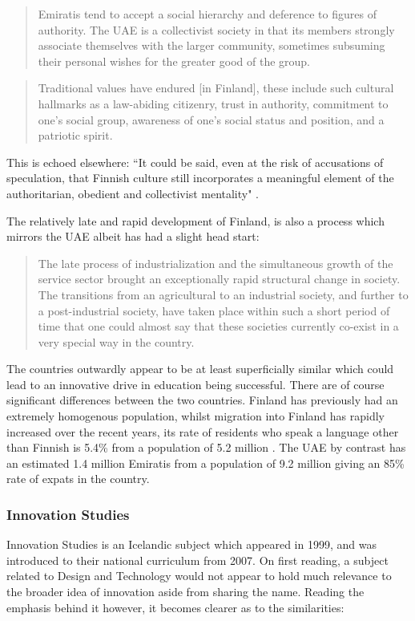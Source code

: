 \documentclass[11pt]{article}
\begin{document}
\begin{quote}
	Emiratis tend to accept a social hierarchy and deference to figures of authority. The UAE is a collectivist society in that its members strongly associate themselves with the larger community, sometimes subsuming their personal wishes for the greater good of the group.
\end{quote} \citep{Hatherley-Greene2016}

\begin{quote}
	Traditional values have endured [in Finland], these include such cultural hallmarks as a law-abiding citizenry, trust in authority, commitment to one’s social group, awareness of one’s social status and position, and a patriotic spirit.
\end{quote} \citep{Sahlberg2007}

This is echoed elsewhere: ``It could be said, even at the risk of accusations of speculation, that Finnish culture still incorporates a meaningful element of the authoritarian, obedient and collectivist mentality" \citep{Simola2005}.

The relatively late and rapid development of Finland, is also a process which mirrors the UAE albeit has had a slight head start:

\begin{quote}
	The late process of industrialization and the simultaneous growth of the service sector brought an exceptionally rapid structural change in society. The transitions from an agricultural to an industrial society, and further to a post-industrial society, have taken place within such a short period of time that one could almost say that these societies currently co-exist in a very special way in the country.
\end{quote} \citep{Simola2005}

The countries outwardly appear to be at least superficially similar which could lead to an innovative drive in education being successful. There are of course significant differences between the two countries. Finland has previously had an extremely homogenous population, whilst migration into Finland has rapidly increased over the recent years, its rate of residents who speak a language other than Finnish is 5.4\% from a population of 5.2 million \citep{OfficialStatisticsofFinlandOSF2011}. The UAE by contrast has an estimated 1.4 million Emiratis \citep{HABBOUSH2013}from a population of 9.2 million \citep{MalitJr.2013} giving an 85\% rate of expats in the country.

\subsubsection{Innovation Studies}
Innovation Studies is an Icelandic subject which appeared in 1999, and was introduced to their national curriculum from 2007. On first reading, a subject related to Design and Technology would not appear to hold much relevance to the broader idea of innovation aside from sharing the name. Reading the emphasis behind it however, it becomes clearer as to the similarities:
\end{document}
